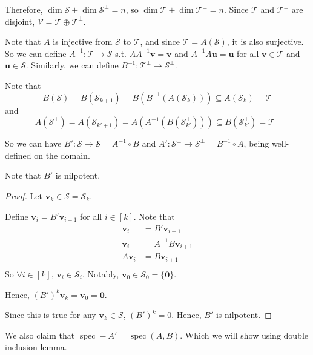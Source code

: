 \documentclass{article}
\newcommand{\0}{\mathbf{0}}
\renewcommand{\vec}{\mathbf}
\newcommand{\vv}{\vec{v}}
\newcommand{\vu}{\vec{u}}
\newcommand{\inv}{^{-1}}
\newcommand{\vecspace}[1]{\mathcal{#1}}
\newcommand{\vsV}{\vecspace{V}}
\newcommand{\vsS}{\vecspace{S}}
\newcommand{\vsT}{\vecspace{T}}
\newcommand{\vsSp}{\vecspace{S}^\perp}
\newcommand{\vsTp}{\vecspace{T}^\perp}
\DeclareMathOperator{\spec}{spec}
\begin{document}
Therefore, $\dim\vsS+\dim\vsSp=n$, so $\dim\vsT+\dim\vsTp=n$.
Since $\vsT$ and $\vsTp$ are disjoint, $\vsV=\vsT\oplus\vsTp$.

Note that $A$ is injective from $\vsS$ to $\vsT$, and since $\vsT=A(\vsS)$, it is also surjective.
So we can define $A\inv:\vsT\to\vsS$ s.t. $AA\inv\vv=\vv$ and $A\inv A\vu=\vu$ for all $\vv\in\vsT$ and $\vu\in\vsS$.
Similarly, we can define $B\inv:\vsTp\to\vsSp$.

Note that
\begin{equation*}
    B(\vsS)=B(\vsS_{k+1})=B(B\inv(A(\vsS_{k})))\subseteq A(\vsS_k)=\vsT
\end{equation*}
and
\begin{equation*}
    A(\vsSp)=A(\vsSp_{k'+1})=A(A\inv(B(\vsSp_{k'})))\subseteq B(\vsSp_{k'})=\vsTp
\end{equation*}

So we can have $B':\vsS\to\vsS=A\inv\circ B$ and $A':\vsSp\to\vsSp=B\inv\circ A$, being well-defined on the domain.

Note that $B'$ is nilpotent.
\begin{proof}
    Let $\vv_k\in\vsS=\vsS_k$.

    Define $\vv_i=B'\vv_{i+1}$ for all $i\in[k]$.
    Note that
    \begin{align*}
        \vv_i&=B'\vv_{i+1}\\
        \vv_i&=A\inv B\vv_{i+1}\\
        A\vv_i&=B\vv_{i+1}\\
    \end{align*}
    So $\forall i\in[k]$, $\vv_i\in\vsS_i$.
    Notably, $\vv_0\in\vsS_0=\{\0\}$.

    Hence, $(B')^k\vv_k=\vv_0=\0$.

    Since this is true for any $\vv_k\in\vsS$, $(B')^k=0$.
    Hence, $B'$ is nilpotent.
\end{proof}

We also claim that $\spec -A'=\spec(A, B)$. Which we will show using double inclusion lemma.
\end{document}
